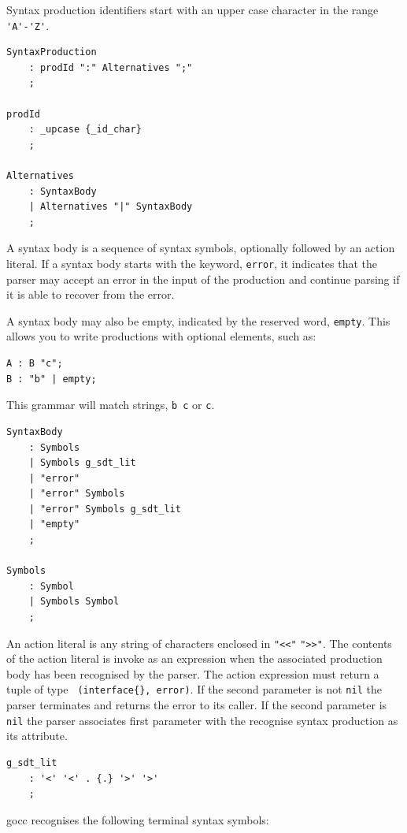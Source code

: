 \documentclass[12pt]{article}
\begin{document}
Syntax production identifiers start with an upper case character in the range \verb|'A'-'Z'|.

\begin{Verbatim}[frame=single]
SyntaxProduction
    : prodId ":" Alternatives ";"
    ;

prodId
    : _upcase {_id_char}
    ;

Alternatives
    : SyntaxBody
    | Alternatives "|" SyntaxBody
    ;
\end{Verbatim}

A syntax body is a sequence of syntax symbols, optionally followed by an action literal. If a syntax body starts with the keyword, \verb|error|, it indicates that the parser may accept an error in the input of the production and continue parsing if it is able to recover from the error.

A syntax body may also be empty, indicated by the reserved word, \verb|empty|. This allows you to write productions with optional elements, such as:

\begin{verbatim}
A : B "c";
B : "b" | empty;
\end{verbatim}

This grammar will match strings, \verb|b c| or \verb|c|.

\begin{Verbatim}[frame=single]
SyntaxBody
    : Symbols
    | Symbols g_sdt_lit
    | "error"
    | "error" Symbols
    | "error" Symbols g_sdt_lit
    | "empty"
    ;

Symbols
    : Symbol
    | Symbols Symbol
    ;
\end{Verbatim}

An action literal is any string of characters enclosed in \verb|"<<"| \verb|">>"|. The contents of the action literal is invoke as an expression when the associated production body has been recognised by the parser. The action expression must return a tuple of type \verb| (interface{}, error)|. If the second parameter is not \verb|nil| the parser terminates and returns the error to its caller. If the second parameter is \verb|nil| the parser associates first parameter with the recognise syntax production as its attribute.

\begin{Verbatim}[frame=single]
g_sdt_lit
    : '<' '<' . {.} '>' '>'
    ;
\end{Verbatim}

gocc recognises the following terminal syntax symbols:
\end{document}
